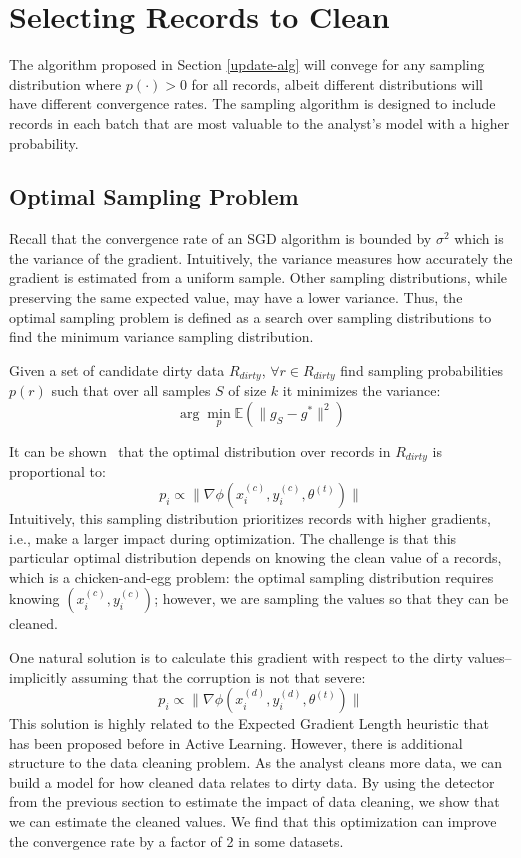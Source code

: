 \section{Selecting Records to Clean}\label{dist-samp}
The algorithm proposed in Section \ref{update-alg} will convege for 
any sampling distribution where  $p(\cdot) > 0$ for all records, albeit different distributions will have different convergence rates.
The sampling algorithm is designed to include records in each batch that are most valuable to the analyst's model with a higher probability.

\subsection{Optimal Sampling Problem}
Recall that the convergence rate of an SGD algorithm is bounded by $\sigma^2$ which is the variance of the gradient.
Intuitively, the variance measures how accurately the gradient is estimated from a uniform sample.
Other sampling distributions, while preserving the same expected value, may have a lower variance.
Thus, the optimal sampling problem is defined as a search over sampling distributions to find the minimum variance sampling distribution.

\begin{definition}
Given a set of candidate dirty data $R_{dirty}$, $\forall r \in R_{dirty}$ find sampling probabilities $p(r)$ such that over all samples $S$ of size $k$ it minimizes the variance:
\[
\arg\min_p \mathbb{E}(\|g_S - g^*\|^2)
\]
\end{definition}

It can be shown~\cite{zhao2014stochastic} that the optimal distribution over records in $R_{dirty}$ is proportional to:
\[
p_i \propto \|\nabla\phi(x^{(c)}_i,y^{(c)}_i,\theta^{(t)})\|
\]
Intuitively, this sampling distribution prioritizes records with higher gradients, i.e., make a larger impact during optimization.
The challenge is that this particular optimal distribution depends on knowing the clean value of a records, which is a chicken-and-egg problem:
the optimal sampling distribution requires knowing $(x^{(c)}_i,y^{(c)}_i)$; however, we are sampling the values so that they can be cleaned.

One natural solution is to calculate this gradient with respect to the dirty values--implicitly assuming that the corruption is not that severe:
\[
p_i \propto \|\nabla\phi(x^{(d)}_i,y^{(d)}_i,\theta^{(t)})\|
\]
This solution is highly related to the Expected Gradient Length heuristic that has been proposed before in Active Learning\cite{settles2010active}.
However, there is additional structure to the data cleaning problem.
As the analyst cleans more data, we can build a model for how cleaned data relates to dirty data.
By using the detector from the previous section to estimate the impact of data cleaning, we show that we can estimate the cleaned values.
We find that this optimization can improve the convergence rate by a factor of 2 in some datasets.




